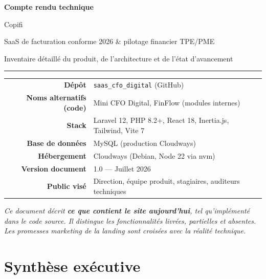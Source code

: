 \documentclass[11pt,a4paper]{report}
\newcommand{\filepath}[1]{\texttt{\small #1}}
\begin{document}
\begin{titlepage}
    \centering
    \vspace*{0.8cm}
    {\Huge\bfseries\color{copifiobsidian} Compte rendu technique\par}
    \vspace{0.5cm}
    {\LARGE\color{copifiemerald} Copifi\par}
    \vspace{0.35cm}
    {\large SaaS de facturation conforme 2026 \& pilotage financier TPE/PME\par}
    \vspace{0.25cm}
    {\normalsize Inventaire détaillé du produit, de l'architecture et de l'état d'avancement\par}
    \vspace{1.2cm}
    \rule{0.82\textwidth}{1pt}
    \vspace{0.9cm}
    \begin{tabular}{>{\bfseries}r p{9.4cm}}
        Dépôt & \filepath{saas\_cfo\_digital} (GitHub) \\
        Noms alternatifs (code) & Mini CFO Digital, FinFlow (modules internes) \\
        Stack & Laravel 12, PHP 8.2+, React 18, Inertia.js, Tailwind, Vite 7 \\
        Base de données & MySQL (production Cloudways) \\
        Hébergement & Cloudways (Debian, Node 22 via nvm) \\
        Version document & 1.0 — Juillet 2026 \\
        Public visé & Direction, équipe produit, stagiaires, auditeurs techniques \\
    \end{tabular}
    \vfill
    \begin{minipage}{0.9\textwidth}
        \centering
        \small\itshape
        Ce document décrit \textbf{ce que contient le site aujourd'hui}, tel qu'implémenté dans le code source.
        Il distingue les fonctionnalités livrées, partielles et absentes.
        Les promesses marketing de la landing sont croisées avec la réalité technique.
    \end{minipage}
\end{titlepage}

\tableofcontents
\cleardoublepage

\chapter{Synthèse exécutive}
\end{document}

